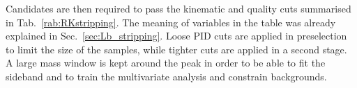 Candidates are then required to pass the kinematic and quality cuts summarised in Tab.~\ref{rab:RKstripping}. 
The meaning of variables in the table was already explained in Sec.~\ref{sec:Lb_stripping}.
Loose PID cuts are applied in preselection to limit the size of the samples, while tighter cuts are applied
in a second stage. A large mass window is kept around the \Bz peak in order to be able
to fit the sideband and to train the multivariate analysis and constrain backgrounds.
%
%
